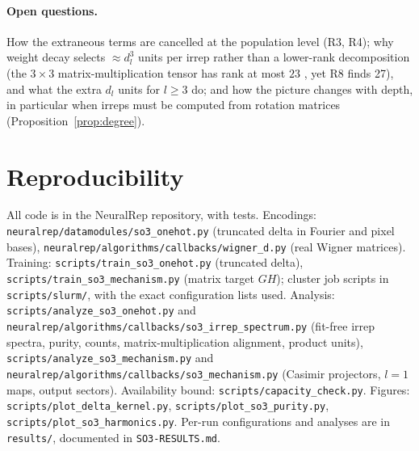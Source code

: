 \documentclass[a4paper,11pt]{article}
\theoremstyle{remark}
\theoremstyle{definition}
\begin{document}
\paragraph{Open questions.} How the extraneous terms are cancelled at the
population level (R3, R4); why weight decay selects $\approx d_l^3$ units per irrep
rather than a lower-rank decomposition (the $3\times3$ matrix-multiplication tensor
has rank at most $23$ \cite{laderman1976}, yet R8 finds 27), and what the extra $d_l$
units for $l\ge3$ do; and how the picture changes with depth, in particular when
irreps must be computed from rotation matrices (Proposition~\ref{prop:degree}).

\section*{Reproducibility}
{\sloppy
All code is in the NeuralRep repository, with tests. Encodings:
\texttt{neuralrep/datamodules/so3\_onehot.py} (truncated delta in Fourier and
pixel bases), \texttt{neuralrep/algorithms/callbacks/wigner\_d.py} (real Wigner
matrices). Training: \texttt{scripts/train\_so3\_onehot.py} (truncated delta),
\texttt{scripts/train\_so3\_mechanism.py} (matrix target $GH$); cluster job
scripts in \texttt{scripts/slurm/}, with the exact configuration lists used.
Analysis: \texttt{scripts/analyze\_so3\_onehot.py} and
\texttt{neuralrep/algorithms/callbacks/so3\_irrep\_spectrum.py} (fit-free irrep
spectra, purity, counts, matrix-multiplication alignment, product units),
\texttt{scripts/analyze\_so3\_mechanism.py} and
\texttt{neuralrep/algorithms/callbacks/so3\_mechanism.py} (Casimir projectors, $l=1$
maps, output sectors). Availability bound: \texttt{scripts/capacity\_check.py}.
Figures: \texttt{scripts/plot\_delta\_kernel.py}, \texttt{scripts/plot\_so3\_purity.py},
\texttt{scripts/plot\_so3\_harmonics.py}. Per-run configurations and analyses are
in \texttt{results/}, documented in \texttt{SO3-RESULTS.md}.\par}
\end{document}
